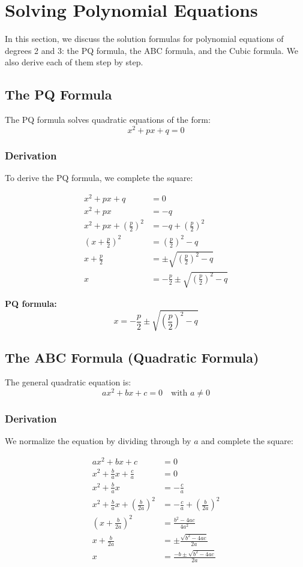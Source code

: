 \section{Solving Polynomial Equations}

In this section, we discuss the solution formulas for polynomial equations of degrees 2 and 3: the PQ formula, the ABC formula, and the Cubic formula. We also derive each of them step by step.

\subsection{The PQ Formula}

The PQ formula solves quadratic equations of the form:
\[
x^2 + px + q = 0
\]

\subsubsection*{Derivation}
To derive the PQ formula, we complete the square:

\begin{align*}
x^2 + px + q &= 0 \\
x^2 + px &= -q \\
x^2 + px + \left(\frac{p}{2}\right)^2 &= -q + \left(\frac{p}{2}\right)^2 \\
\left(x + \frac{p}{2}\right)^2 &= \left(\frac{p}{2}\right)^2 - q \\
x + \frac{p}{2} &= \pm \sqrt{\left(\frac{p}{2}\right)^2 - q} \\
x &= -\frac{p}{2} \pm \sqrt{\left(\frac{p}{2}\right)^2 - q}
\end{align*}

\textbf{PQ formula:}
\[
x = -\frac{p}{2} \pm \sqrt{\left(\frac{p}{2}\right)^2 - q}
\]

\subsection{The ABC Formula (Quadratic Formula)}

The general quadratic equation is:
\[
ax^2 + bx + c = 0
\quad\text{with } a \ne 0
\]

\subsubsection*{Derivation}
We normalize the equation by dividing through by \(a\) and complete the square:

\begin{align*}
ax^2 + bx + c &= 0 \\
x^2 + \frac{b}{a}x + \frac{c}{a} &= 0 \\
x^2 + \frac{b}{a}x &= -\frac{c}{a} \\
x^2 + \frac{b}{a}x + \left(\frac{b}{2a}\right)^2 &= -\frac{c}{a} + \left(\frac{b}{2a}\right)^2 \\
\left(x + \frac{b}{2a}\right)^2 &= \frac{b^2 - 4ac}{4a^2} \\
x + \frac{b}{2a} &= \pm \frac{\sqrt{b^2 - 4ac}}{2a} \\
x &= \frac{-b \pm \sqrt{b^2 - 4ac}}{2a}
\end{align*}

